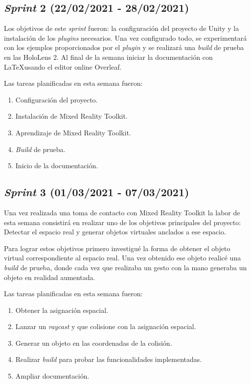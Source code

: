 \subsection{\textit{Sprint} 2 (22/02/2021 - 28/02/2021)}
Los objetivos de este \textit{sprint} fueron: la configuración del proyecto de Unity y la instalación de los \textit{plugins} necesarios. Una vez configurado todo, se experimentará con los ejemplos proporcionados por el \textit{plugin} y se realizará una \textit{build} de prueba en las HoloLens 2. Al final de la semana iniciar la documentación con \LaTeX  usando el editor online Overleaf.

Las tareas planificadas en esta semana fueron:
\begin{enumerate}
    \item Configuración del proyecto.
    \item Instalación de Mixed Reality Toolkit.
    \item Aprendizaje de Mixed Reality Toolkit.
    \item \textit{Build} de prueba.
    \item Inicio de la documentación.
\end{enumerate}
\subsection{\textit{Sprint} 3 (01/03/2021 - 07/03/2021)} \label{spint3}
Una vez realizada una toma de contacto con Mixed Reality Toolkit la labor de esta semana consistirá en realizar uno de los objetivos principales del proyecto: Detectar el espacio real y generar objetos virtuales anclados a ese espacio.

Para lograr estos objetivos primero investigué la forma de obtener el objeto virtual correspondiente al espacio real. Una vez obtenido ese objeto realicé una \textit{build} de prueba, donde cada vez que realizaba un gesto con la mano generaba un objeto en realidad aumentada.

Las tareas planificadas en esta semana fueron:
\begin{enumerate}
    \item Obtener la asignación espacial.
    \item Lanzar un \textit{raycast} y que colisione con la asignación espacial.
    \item Generar un objeto en las coordenadas de la colisión.
    \item Realizar \textit{build} para probar las funcionalidades implementadas.
    \item Ampliar documentación.
\end{enumerate}
